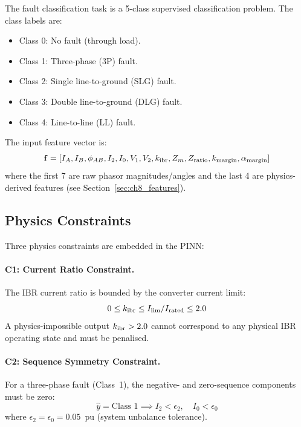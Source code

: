 The fault classification task is a 5-class supervised classification
problem. The class labels are:
\begin{itemize}
\item Class 0: No fault (through load).
\item Class 1: Three-phase (3P) fault.
\item Class 2: Single line-to-ground (SLG) fault.
\item Class 3: Double line-to-ground (DLG) fault.
\item Class 4: Line-to-line (LL) fault.
\end{itemize}
The input feature vector is:
\begin{equation}
  \mathbf{f} = [I_A, I_B, \phi_{AB}, I_2, I_0, V_1, V_2, k_\mathrm{ibr},
                Z_m, Z_\mathrm{ratio}, k_\mathrm{margin}, \alpha_\mathrm{margin}]
  \label{eq:ch8_features}
\end{equation}
where the first 7 are raw phasor magnitudes/angles and the last 4 are
physics-derived features (see Section~\ref{sec:ch8_features}).

\subsection{Physics Constraints}

Three physics constraints are embedded in the PINN:

\paragraph{C1: Current Ratio Constraint.}
The IBR current ratio is bounded by the converter current limit:
\begin{equation}
  0 \leq k_\mathrm{ibr} \leq I_\mathrm{lim}/I_\mathrm{rated} \leq 2.0
  \label{eq:ch8_c1}
\end{equation}
A physics-impossible output $k_\mathrm{ibr} > 2.0$ cannot correspond to any
physical IBR operating state and must be penalised.

\paragraph{C2: Sequence Symmetry Constraint.}
For a three-phase fault (Class~1), the negative- and zero-sequence
components must be zero:
\begin{equation}
  \hat{y} = \text{Class 1} \implies I_2 < \epsilon_2, \quad I_0 < \epsilon_0
  \label{eq:ch8_c2}
\end{equation}
where $\epsilon_2 = \epsilon_0 = 0.05$~pu (system unbalance tolerance).

